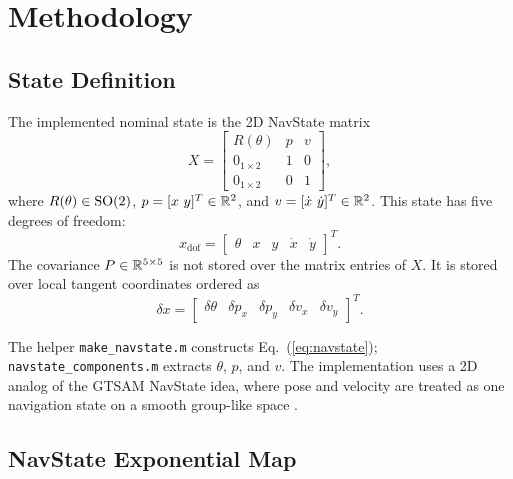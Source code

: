 \section{Methodology}

\subsection{State Definition}

The implemented nominal state is the 2D NavState matrix
\begin{equation}
X =
\begin{bmatrix}
R(\theta) & p & v \\
0_{1\times 2} & 1 & 0 \\
0_{1\times 2} & 0 & 1
\end{bmatrix},
\label{eq:navstate}
\end{equation}
where \(R(\theta)\in \mathrm{SO}(2)\), \(p=[x\ y]^T\in\mathbb{R}^2\), and \(v=[\dot{x}\ \dot{y}]^T\in\mathbb{R}^2\). This state has five degrees of freedom:
\begin{equation}
    x_{\mathrm{dof}} =
    \begin{bmatrix}
    \theta & x & y & \dot{x} & \dot{y}
    \end{bmatrix}^{T}.
\end{equation}
The covariance \(P\in\mathbb{R}^{5\times 5}\) is not stored over the matrix entries of \(X\). It is stored over local tangent coordinates ordered as
\begin{equation}
    \delta x =
    \begin{bmatrix}
    \delta \theta &
    \delta p_x &
    \delta p_y &
    \delta v_x &
    \delta v_y
    \end{bmatrix}^{T}.
\label{eq:error_state}
\end{equation}

The helper \texttt{make\_navstate.m} constructs Eq.~(\ref{eq:navstate}); \texttt{navstate\_components.m} extracts \(\theta\), \(p\), and \(v\). The implementation uses a 2D analog of the GTSAM NavState idea, where pose and velocity are treated as one navigation state on a smooth group-like space \citep{gtsamNavigation,gtsamNavState,forster2015imu}.

\subsection{NavState Exponential Map}


